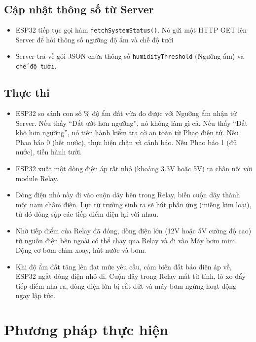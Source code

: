 \documentclass[12pt,a4paper]{report}
\begin{document}
\subsection{Cập nhật thông số từ Server}

\begin{itemize}
    \item ESP32 tiếp tục gọi hàm \texttt{fetchSystemStatus()}. Nó gửi một HTTP GET lên Server để hỏi thông số ngưỡng độ ẩm và chế độ tưới
    \item Server trả về gói JSON chứa thông số \texttt{humidityThreshold} (Ngưỡng ẩm) và \texttt{chế độ tưới}.
\end{itemize}

\subsection{Thực thi}

\begin{itemize}
    \item ESP32 so sánh con số \% độ ẩm đất vừa đo được với Ngưỡng ẩm nhận từ Server. Nếu thấy ``Đất ướt hơn ngưỡng'', nó không làm gì cả. Nếu thấy ``Đất khô hơn ngưỡng'', nó tiến hành kiểm tra cờ an toàn từ Phao điện tử. Nếu Phao báo 0 (hết nước), thực hiện chặn và cảnh báo. Nếu Phao báo 1 (đủ nước), tiến hành tưới.
    \item ESP32 xuất một dòng điện áp rất nhỏ (khoảng 3.3V hoặc 5V) ra chân nối với module Relay.
    \item Dòng điện nhỏ này đi vào cuộn dây bên trong Relay, biến cuộn dây thành một nam châm điện. Lực từ trường sinh ra sẽ hút phần ứng (miếng kim loại), từ đó đóng sập các tiếp điểm điện lại với nhau.
    \item Nhờ tiếp điểm của Relay đã đóng, dòng điện lớn (12V hoặc 5V cường độ cao) từ nguồn điện bên ngoài có thể chạy qua Relay và đi vào Máy bơm mini. Động cơ bơm chìm xoay, hút nước và bơm.
    \item Khi độ ẩm đất tăng lên đạt mức yêu cầu, cảm biến đất báo điện áp về, ESP32 ngắt dòng điện nhỏ đi. Cuộn dây trong Relay mất từ tính, lò xo đẩy tiếp điểm nhả ra, dòng điện lớn bị cắt đứt và máy bơm ngừng hoạt động ngay lập tức.
\end{itemize}


\section{Phương pháp thực hiện}
\end{document}
